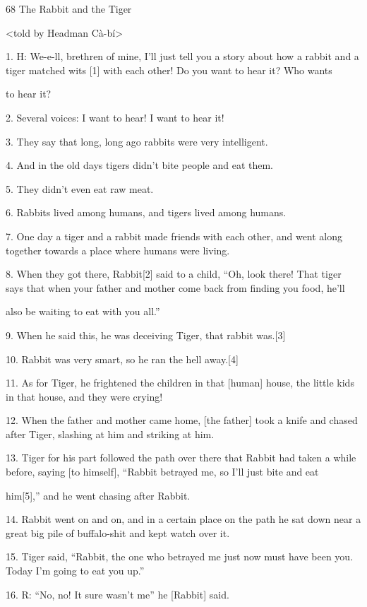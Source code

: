 
{68 The Rabbit and the Tiger}

{<told by Headman Cà-bí>}

{1. H: We-e-ll, brethren of mine, I'll just tell you a story about how a
rabbit and a tiger matched wits [1] with each other! Do you want to hear it? Who
wants     }

{to hear it?}

{2. Several voices: I want to hear! I want to hear it!        }

{3. They say that long, long ago rabbits were very intelligent.}

{4. And in the old days tigers didn't bite people and eat them.}

{5. They didn't even eat raw meat.}

{6. Rabbits lived among humans, and tigers lived among humans.}

{7. One day a tiger and a rabbit made friends with each other, and went
along together towards a place where humans were living.}

{8. When they got there, Rabbit[2] said to a child, ``Oh, look there! That
tiger says that when your father and mother come back from finding you food, he'll
}

{also be waiting to eat with you all.''}

{9. When he said this, he was deceiving Tiger, that rabbit was.[3]}

{10. Rabbit was very smart, so he ran the hell away.[4]}

{11. As for Tiger, he frightened the children in that [human] house, the
little kids in that house, and they were crying!}

{12. When the father and mother came home, [the father] took a knife and
chased after Tiger, slashing at him and striking at him.}

{13. Tiger for his part followed the path over there that Rabbit had taken
a while before, saying [to himself], ``Rabbit betrayed me, so I'll just bite and
eat       }

{him[5],'' and he went chasing after Rabbit.




14. Rabbit went on and on, and in a certain place on the
path he sat down near a great big pile of buffalo-shit and kept watch over it.
}

{15. Tiger said, ``Rabbit, the one who betrayed me just now must have been
you. Today I'm going to eat you up.''}

{16. R: ``No, no! It sure wasn't me'' he [Rabbit] said.}

